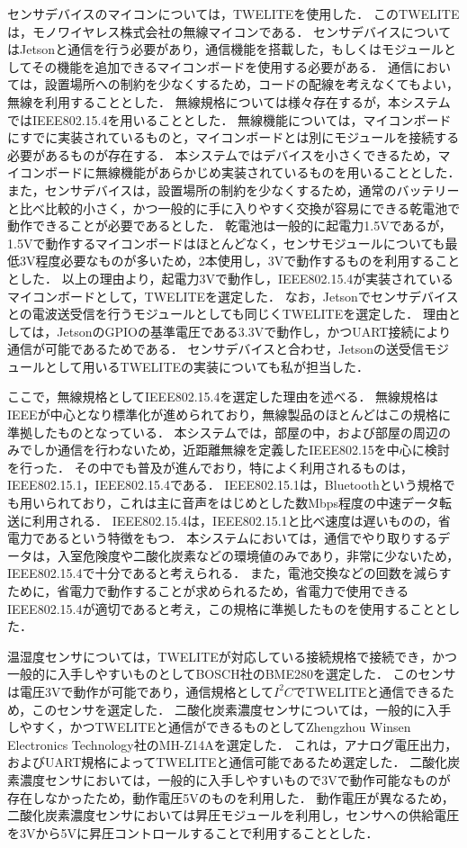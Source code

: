 センサデバイスのマイコンについては，TWELITEを使用した．
このTWELITEは，モノワイヤレス株式会社の無線マイコンである\cite{twelite}．
センサデバイスについてはJetsonと通信を行う必要があり，通信機能を搭載した，もしくはモジュールとしてその機能を追加できるマイコンボードを使用する必要がある．
通信においては，設置場所への制約を少なくするため，コードの配線を考えなくてもよい，無線を利用することとした．
無線規格については様々存在するが，本システムではIEEE802.15.4を用いることとした．
無線機能については，マイコンボードにすでに実装されているものと，マイコンボードとは別にモジュールを接続する必要があるものが存在する．
本システムではデバイスを小さくできるため，マイコンボードに無線機能があらかじめ実装されているものを用いることとした．
また，センサデバイスは，設置場所の制約を少なくするため，通常のバッテリーと比べ比較的小さく，かつ一般的に手に入りやすく交換が容易にできる乾電池で動作できることが必要であるとした．
乾電池は一般的に起電力1.5Vであるが，1.5Vで動作するマイコンボードはほとんどなく，センサモジュールについても最低3V程度必要なものが多いため，2本使用し，3Vで動作するものを利用することとした．
以上の理由より，起電力3Vで動作し，IEEE802.15.4が実装されているマイコンボードとして，TWELITEを選定した．
なお，Jetsonでセンサデバイスとの電波送受信を行うモジュールとしても同じくTWELITEを選定した．
理由としては，JetsonのGPIOの基準電圧である3.3Vで動作し，かつUART接続により通信が可能であるためである．
センサデバイスと合わせ，Jetsonの送受信モジュールとして用いるTWELITEの実装についても私が担当した．

ここで，無線規格としてIEEE802.15.4を選定した理由を述べる．
無線規格はIEEEが中心となり標準化が進められており，無線製品のほとんどはこの規格に準拠したものとなっている．
本システムでは，部屋の中，および部屋の周辺のみでしか通信を行わないため，近距離無線を定義したIEEE802.15を中心に検討を行った．
その中でも普及が進んでおり，特によく利用されるものは，IEEE802.15.1，IEEE802.15.4である\cite{wnet}．
IEEE802.15.1は，Bluetoothという規格でも用いられており，これは主に音声をはじめとした数Mbps程度の中速データ転送に利用される\cite{wnet}．
IEEE802.15.4は，IEEE802.15.1と比べ速度は遅いものの，省電力であるという特徴をもつ．
本システムにおいては，通信でやり取りするデータは，入室危険度や二酸化炭素などの環境値のみであり，非常に少ないため，IEEE802.15.4で十分であると考えられる．
また，電池交換などの回数を減らすために，省電力で動作することが求められるため，省電力で使用できるIEEE802.15.4が適切であると考え，この規格に準拠したものを使用することとした．

温湿度センサについては，TWELITEが対応している接続規格で接続でき，かつ一般的に入手しやすいものとしてBOSCH社のBME280を選定した．
このセンサは電圧3Vで動作が可能であり，通信規格として$I^2C$でTWELITEと通信できるため，このセンサを選定した．
二酸化炭素濃度センサについては，一般的に入手しやすく，かつTWELITEと通信ができるものとしてZhengzhou Winsen Electronics Technology社のMH-Z14Aを選定した．
これは，アナログ電圧出力，およびUART規格によってTWELITEと通信可能であるため選定した．
二酸化炭素濃度センサにおいては，一般的に入手しやすいもので3Vで動作可能なものが存在しなかったため，動作電圧5Vのものを利用した．
動作電圧が異なるため，二酸化炭素濃度センサにおいては昇圧モジュールを利用し，センサへの供給電圧を3Vから5Vに昇圧コントロールすることで利用することとした．





